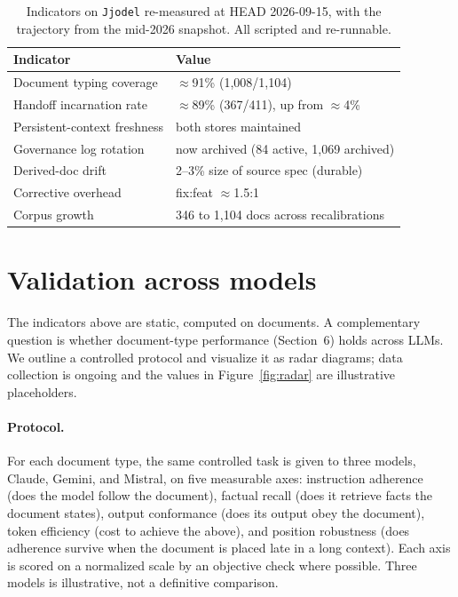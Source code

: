 \documentclass[sigconf]{acmart}
\begin{document}
\begin{table}[t]
\caption{Indicators on \texttt{Jjodel} re-measured at HEAD 2026-09-15, with the trajectory from the mid-2026 snapshot. All scripted and re-runnable.}
\label{tab:ind}
\small
\begin{tabularx}{\columnwidth}{@{}Xl@{}}
\toprule
Indicator & Value \\
\midrule
Document typing coverage & $\approx$91\% (1{,}008/1{,}104) \\
Handoff incarnation rate & $\approx$89\% (367/411), up from $\approx$4\% \\
Persistent-context freshness & both stores maintained \\
Governance log rotation & now archived (84 active, 1{,}069 archived) \\
Derived-doc drift & 2--3\% size of source spec (durable) \\
Corrective overhead & fix:feat $\approx$1.5:1 \\
Corpus growth & 346 to 1{,}104 docs across recalibrations \\
\bottomrule
\end{tabularx}
\end{table}

\section{Validation across models}
The indicators above are static, computed on documents. A complementary question is whether document-type performance (Section~6) holds across LLMs. We outline a controlled protocol and visualize it as radar diagrams; data collection is ongoing and the values in Figure~\ref{fig:radar} are illustrative placeholders.

\paragraph{Protocol.} For each document type, the same controlled task is given to three models, Claude, Gemini, and Mistral, on five measurable axes: instruction adherence (does the model follow the document), factual recall (does it retrieve facts the document states), output conformance (does its output obey the document), token efficiency (cost to achieve the above), and position robustness (does adherence survive when the document is placed late in a long context). Each axis is scored on a normalized scale by an objective check where possible. Three models is illustrative, not a definitive comparison.
\end{document}
